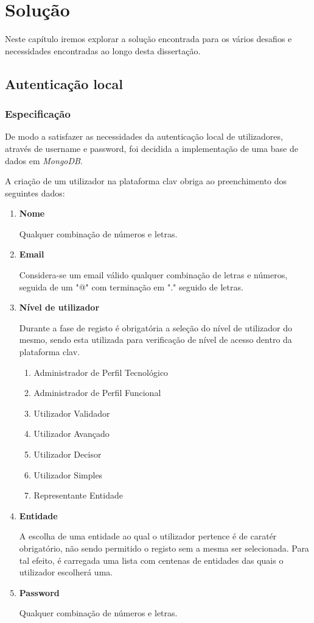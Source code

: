 \cleardoublepage
\chapter{Solução} \label{capituloSolucoes}

Neste capítulo iremos explorar a solução encontrada para os vários desafios e necessidades encontradas ao longo desta dissertação.

\section{Autenticação local}

\subsection{Especificação} \label{especificacaoAuthLocal}

De modo a satisfazer as necessidades da autenticação local de utilizadores, através de username e password, foi decidida a implementação de uma base de dados em \emph{MongoDB}.

A criação de um utilizador na plataforma \gls{clav} obriga ao preenchimento dos seguintes dados:

\begin{enumerate}
    \item \textbf{Nome}
    
        Qualquer combinação de números e letras.
    \item \textbf{Email}
    
        Considera-se um email válido qualquer combinação de letras e números, seguida de um "@" com terminação em "." seguido de letras.
    \item \textbf{Nível de utilizador}
    
        Durante a fase de registo é obrigatória a seleção do nível de utilizador do mesmo, sendo esta utilizada para verificação de nível de acesso dentro da plataforma \gls{clav}.
    \begin{enumerate}
        \item Administrador de Perfil Tecnológico
        \item Administrador de Perfil Funcional
        \item Utilizador Validador
        \item Utilizador Avançado
        \item Utilizador Decisor
        \item Utilizador Simples
        \item Representante Entidade
    \end{enumerate}
    \item \textbf{Entidade}
    
        A escolha de uma entidade ao qual o utilizador pertence é de caratér obrigatório, não sendo permitido o registo sem a mesma ser selecionada. Para tal efeito, é carregada uma lista com centenas de entidades das quais o utilizador escolherá uma.
        
    \item \textbf{Password}
    
        Qualquer combinação de números e letras.
\end{enumerate}

